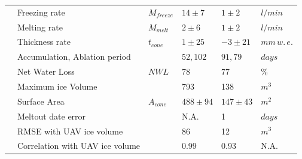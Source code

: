 \documentclass[utf8]{frontiersSCNS}
\begin{document}
\begin{table}
\begin{tabular}{@{}|llllll|@{}}
		                       & Freezing rate                   & $M_{freeze}$    & $14 \pm 7$    & $1 \pm 2$     & $l/min$ \\
		\multicolumn{1}{|l|}{} & Melting rate                    & $M_{melt}$      & $2 \pm 6$     & $1 \pm 2$     & $l/min$ \\
		\multicolumn{1}{|l|}{} & Thickness rate                  & $t_{cone}$      & $1 \pm 25$    & $-3 \pm 21$   &
		$mm \, w.\,e.$                                                                                                       \\
		\multicolumn{1}{|l|}{} & Accumulation, Ablation period   &                 & $52, 102$     & $91,79$       & $days$  \\
		\multicolumn{1}{|l|}{} & Net Water Loss                  & $NWL$           & 78            & 77
		                       & \%                                                                                          \\
		\multicolumn{1}{|l|}{} & Maximum ice Volume              &                 & 793           & 138           & $m^{3}$ \\
		\multicolumn{1}{|l|}{} & Surface Area                    & $A_{cone}$      & $488 \pm 94$  & $147 \pm 43$  & $m^{2}$ \\\midrule
		\multicolumn{1}{|l|}{\multirow{3}{*}{\rotatebox[origin=c]{90}{Model}}}
		                       & Meltout date error              &                 & N.A.          & 1             & $days$  \\
		\multicolumn{1}{|l|}{} & RMSE with UAV ice volume        &                 & 86            & 12            & $m^{3}$ \\
		\multicolumn{1}{|l|}{} & Correlation with UAV ice volume &                 & 0.99          & 0.93          &
		N.A.                                                                                                                 \\\bottomrule
	\end{tabular}
\end{table}
\end{document}
